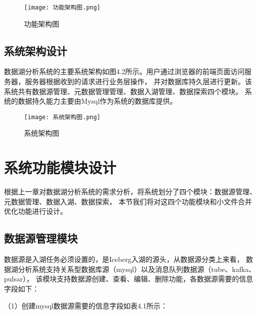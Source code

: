 \begin{figure}[h]
  \centering
  \texttt{[image: 功能架构图.png]}
  \caption{功能架构图}
  \label{fig:badge}
\end{figure}

\subsection{系统架构设计}

数据湖分析系统的主要系统架构如图4.2所示。用户通过浏览器的前端页面访问服务器，服务器根据收到的请求进行业务层操作，
并对数据库持久层进行更新。该系统共有数据源管理、元数据管理管理、数据入湖管理、数据探索四个模块。
系统的数据持久能力主要由Mysql作为系统的数据库提供。

\begin{figure}[h]
  \centering
  \texttt{[image: 系统架构图.png]}
  \caption{系统架构图}
  \label{fig:badge}
\end{figure}

\section{系统功能模块设计}

根据上一章对数据湖分析系统的需求分析，将系统划分了四个模块：数据源管理、元数据管理、数据入湖、数据探索，
本节我们将对这四个功能模块和小文件合并优化功能进行设计。

\subsection{数据源管理模块}

数据源是入湖任务必须设置的，是Iceberg入湖的源头，从数据源分类上来看，
数据湖分析系统支持关系型数据库源（mysql）以及消息队列数据源（tube、kafka、pulsar），
该模块支持数据源创建、查看、编辑、删除功能，各数据源需要的信息字段如下：

（1）创建mysql数据源需要的信息字段如表4.1所示：

